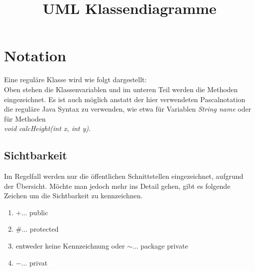 \documentclass[12pt, oneside]{article}   	%
\title{UML Klassendiagramme}
\author{}
\date{}							%
\begin{document}
\maketitle
\tableofcontents

\newpage

\section{Notation}
Eine regul\"are Klasse wird wie folgt dargestellt: \\
Oben stehen die Klassenvariablen und im unteren Teil werden die Methoden eingezeichnet. Es ist auch m\"oglich anstatt der hier verwendeten Pascalnotation die regul\"are Java Syntax zu verwenden, wie etwa f\"ur Variablen \textit{String name} oder f\"ur Methoden \\ \textit{void calcHeight(int x, int y).}\\
\vspace{0.5 cm}
\begin{center}
\end{center}


\subsection{Sichtbarkeit}
Im Regelfall werden nur die \"offentlichen Schnittstellen eingezeichnet, aufgrund der \"Ubersicht. M\"ochte man jedoch mehr ins Detail gehen, gibt es folgende Zeichen um die Sichtbarkeit zu kennzeichnen.
\begin{enumerate}
\item $+ \ldots$ public
\item $\# \ldots$ protected
\item entweder keine Kennzeichnung oder $\sim \ldots$ package private
\item $- \ldots$ privat
\end{enumerate}
\end{document}
